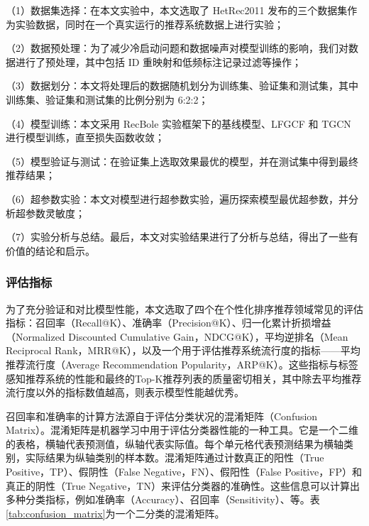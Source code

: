 （1）数据集选择：在本文实验中，本文选取了 HetRec2011 发布的三个数据集作为实验数据，同时在一个真实运行的推荐系统数据上进行实验；

（2）数据预处理：为了减少冷启动问题和数据噪声对模型训练的影响，我们对数据进行了预处理，其中包括 ID 重映射和低频标注记录过滤等操作；

（3）数据划分：本文将处理后的数据随机划分为训练集、验证集和测试集，其中训练集、验证集和测试集的比例分别为 6:2:2；

（4）模型训练：本文采用 RecBole 实验框架下的基线模型、LFGCF 和 TGCN 进行模型训练，直至损失函数收敛；

（5）模型验证与测试：在验证集上选取效果最优的模型，并在测试集中得到最终推荐结果；

（6）超参数实验：本文对模型进行超参数实验，遍历探索模型最优超参数，并分析超参数灵敏度；

（7）实验分析与总结。最后，本文对实验结果进行了分析与总结，得出了一些有价值的结论和启示。

\subsubsection{评估指标}
为了充分验证和对比模型性能，本文选取了四个在个性化排序推荐领域常见的评估指标：召回率（Recall@K）、准确率（Precision@K）\cite{roelleke_information_2022}、归一化累计折损增益（Normalized Discounted Cumulative Gain，NDCG@K）\cite{wang_theoretical_2013}，平均逆排名（Mean Reciprocal Rank，MRR@K）\cite{craswell_mean_2009}，以及一个用于评估推荐系统流行度的指标——平均推荐流行度（Average Recommendation Popularity，ARP@K）\cite{yin_challenging_2012}。这些指标与标签感知推荐系统的性能和最终的Top-K推荐列表的质量密切相关，其中除去平均推荐流行度以外的指标数值越高，则表示模型性能越优秀。

召回率和准确率的计算方法源自于评估分类状况的混淆矩阵（Confusion Matrix）。混淆矩阵是机器学习中用于评估分类器性能的一种工具。它是一个二维的表格，横轴代表预测值，纵轴代表实际值。每个单元格代表预测结果为横轴类别，实际结果为纵轴类别的样本数。混淆矩阵通过计数真正的阳性（True Positive，TP）、假阴性（False Negative，FN）、假阳性（False Positive，FP）和真正的阴性（True Negative，TN）来评估分类器的准确性。这些信息可以计算出多种分类指标，例如准确率（Accuracy）、召回率（Sensitivity）、等。表\ref{tab:confusion_matrix}为一个二分类的混淆矩阵。

